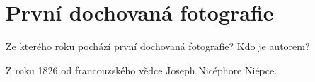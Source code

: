\section{První dochovaná fotografie}
Ze kterého roku pochází první dochovaná fotografie? Kdo je autorem?

Z roku 1826 od francouzského vědce Joseph Nicéphore Niépce.